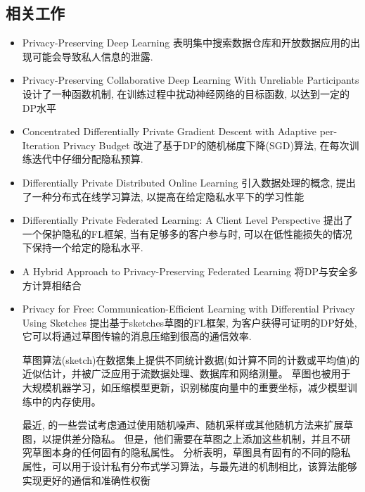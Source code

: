 \subsection{相关工作}
\begin{itemize} 
    \item Privacy-Preserving Deep Learning  \cite{shokri2015privacy}表明集中搜索数据仓库和开放数据应用的出现可能会导致私人信息的泄露. 
    \item Privacy-Preserving Collaborative Deep Learning With Unreliable Participants  \cite{zhao2020collaborative}设计了一种函数机制, 在训练过程中扰动神经网络的目标函数, 以达到一定的DP水平
    \item Concentrated Differentially Private Gradient Descent with Adaptive per-Iteration Privacy Budget \cite{Lee2018ConcentratedDP}  改进了基于DP的随机梯度下降(SGD)算法, 在每次训练迭代中仔细分配隐私预算. 
    \item Differentially Private Distributed Online Learning \cite{Li2018DiffOnline}  引入数据处理的概念, 提出了一种分布式在线学习算法, 以提高在给定隐私水平下的学习性能
    \item Differentially Private Federated Learning: A Client Level Perspective \cite{Geyer2017Client} 提出了一个保护隐私的FL框架, 当有足够多的客户参与时, 可以在低性能损失的情况下保持一个给定的隐私水平. 
    \item A Hybrid Approach to Privacy-Preserving Federated Learning\cite{Truex:2019:HAP:3338501.3357370} 将DP与安全多方计算相结合 
    \item Privacy for Free: Communication-Efficient Learning with Differential Privacy Using Sketches \cite{li2019privacy}  提出基于sketches草图的FL框架, 为客户获得可证明的DP好处, 它可以将通过草图传输的消息压缩到很高的通信效率. 
    
草图算法(sketch)在数据集上提供不同统计数据(如计算不同的计数或平均值)的近似估计，并被广泛应用于流数据处理、数据库和网络测量。
草图也被用于大规模机器学习，如压缩模型更新，识别梯度向量中的重要坐标，减少模型训练中的内存使用。

最近, 的一些尝试考虑通过使用随机噪声、随机采样或其他随机方法来扩展草图，以提供差分隐私。
但是，他们需要在草图之上添加这些机制，并且不研究草图本身的任何固有的隐私属性。
分析表明，草图具有固有的不同的隐私属性，可以用于设计私有分布式学习算法，与最先进的机制相比，该算法能够实现更好的通信和准确性权衡
     
\end{itemize}

